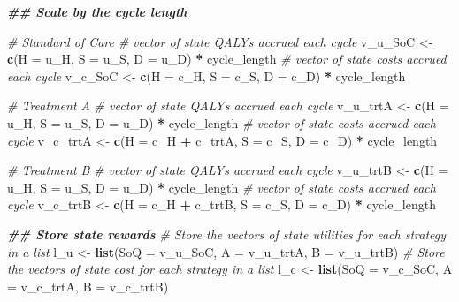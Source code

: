 \documentclass[
]{article}
\newenvironment{Shaded}{\begin{snugshade}}{\end{snugshade}}
\newcommand{\AttributeTok}[1]{\textcolor[rgb]{0.13,0.29,0.53}{#1}}
\newcommand{\CommentTok}[1]{\textcolor[rgb]{0.56,0.35,0.01}{\textit{#1}}}
\newcommand{\DocumentationTok}[1]{\textcolor[rgb]{0.56,0.35,0.01}{\textbf{\textit{#1}}}}
\newcommand{\FunctionTok}[1]{\textcolor[rgb]{0.13,0.29,0.53}{\textbf{#1}}}
\newcommand{\NormalTok}[1]{#1}
\newcommand{\OtherTok}[1]{\textcolor[rgb]{0.56,0.35,0.01}{#1}}
\newcommand{\SpecialCharTok}[1]{\textcolor[rgb]{0.81,0.36,0.00}{\textbf{#1}}}
\begin{document}
\begin{Shaded}
\begin{Highlighting}[]
\DocumentationTok{\#\# Scale by the cycle length}

\CommentTok{\# Standard of Care}
\CommentTok{\# vector of state QALYs accrued each cycle}
\NormalTok{v\_u\_SoC    }\OtherTok{\textless{}{-}} \FunctionTok{c}\NormalTok{(}\AttributeTok{H  =}\NormalTok{ u\_H, }
                \AttributeTok{S  =}\NormalTok{ u\_S,}
                \AttributeTok{D  =}\NormalTok{ u\_D) }\SpecialCharTok{*}\NormalTok{ cycle\_length}
\CommentTok{\# vector of state costs accrued each cycle}
\NormalTok{v\_c\_SoC    }\OtherTok{\textless{}{-}} \FunctionTok{c}\NormalTok{(}\AttributeTok{H  =}\NormalTok{ c\_H, }
                \AttributeTok{S  =}\NormalTok{ c\_S,}
                \AttributeTok{D  =}\NormalTok{ c\_D) }\SpecialCharTok{*}\NormalTok{ cycle\_length}

\CommentTok{\# Treatment A}
\CommentTok{\# vector of state QALYs accrued each cycle}
\NormalTok{v\_u\_trtA   }\OtherTok{\textless{}{-}} \FunctionTok{c}\NormalTok{(}\AttributeTok{H  =}\NormalTok{ u\_H, }
                \AttributeTok{S  =}\NormalTok{ u\_S, }
                \AttributeTok{D  =}\NormalTok{ u\_D) }\SpecialCharTok{*}\NormalTok{ cycle\_length}
\CommentTok{\# vector of state costs accrued each cycle}
\NormalTok{v\_c\_trtA   }\OtherTok{\textless{}{-}} \FunctionTok{c}\NormalTok{(}\AttributeTok{H  =}\NormalTok{ c\_H }\SpecialCharTok{+}\NormalTok{ c\_trtA, }
                \AttributeTok{S  =}\NormalTok{ c\_S, }
                \AttributeTok{D  =}\NormalTok{ c\_D) }\SpecialCharTok{*}\NormalTok{ cycle\_length}

\CommentTok{\# Treatment B}
\CommentTok{\# vector of state QALYs accrued each cycle}
\NormalTok{v\_u\_trtB   }\OtherTok{\textless{}{-}} \FunctionTok{c}\NormalTok{(}\AttributeTok{H  =}\NormalTok{ u\_H, }
                \AttributeTok{S  =}\NormalTok{ u\_S, }
                \AttributeTok{D  =}\NormalTok{ u\_D) }\SpecialCharTok{*}\NormalTok{ cycle\_length}
\CommentTok{\# vector of state costs accrued each cycle}
\NormalTok{v\_c\_trtB   }\OtherTok{\textless{}{-}} \FunctionTok{c}\NormalTok{(}\AttributeTok{H  =}\NormalTok{ c\_H }\SpecialCharTok{+}\NormalTok{ c\_trtB, }
                \AttributeTok{S  =}\NormalTok{ c\_S, }
                \AttributeTok{D  =}\NormalTok{ c\_D) }\SpecialCharTok{*}\NormalTok{ cycle\_length}

\DocumentationTok{\#\# Store state rewards }
\CommentTok{\# Store the vectors of state utilities for each strategy in a list }
\NormalTok{l\_u   }\OtherTok{\textless{}{-}} \FunctionTok{list}\NormalTok{(}\AttributeTok{SoQ =}\NormalTok{ v\_u\_SoC,}
              \AttributeTok{A   =}\NormalTok{ v\_u\_trtA,}
              \AttributeTok{B   =}\NormalTok{ v\_u\_trtB)}
\CommentTok{\# Store the vectors of state cost for each strategy in a list }
\NormalTok{l\_c   }\OtherTok{\textless{}{-}} \FunctionTok{list}\NormalTok{(}\AttributeTok{SoQ =}\NormalTok{ v\_c\_SoC,}
              \AttributeTok{A   =}\NormalTok{ v\_c\_trtA,}
              \AttributeTok{B   =}\NormalTok{ v\_c\_trtB)}


\end{Highlighting}
\end{Shaded}
\end{document}
